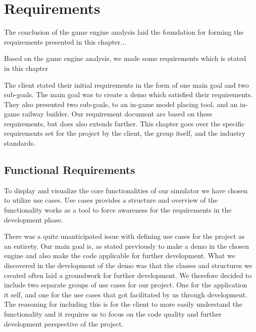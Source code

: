 \chapter{Requirements}

The conclusion of the game engine analysis laid the foundation for forming the requirements presented in this chapter...

Based on the game engine analysis, we made some requirements which is stated in this chapter


The client stated their initial requirements in the form of one main goal and two sub-goals. The main goal was to create a demo which satisfied their requirements. They also presented two sub-goals, to an in-game model placing tool, and an in-game railway builder. Our requirement document are based on these requirements, but does also extends further. This chapter goes over the specific requirements set for the project by the client, the group itself, and the industry standards.


\section{Functional Requirements}

To display and visualize the core functionalities of our simulator we have chosen to utilize use cases. Use cases provides a structure and overview of the functionality works as a tool to force awareness for the requirements in the development phase. 

There was a quite unanticipated issue with defining use cases for the project as an entirety. Our main goal is, as stated previously to make a demo in the chosen engine and also make the code applicable for further development. What we discovered in the development of the demo was that the classes and structures we created often laid a groundwork for further development. We therefore decided to include two separate groups of use cases for our project. One for the application it self, and one for the use cases that got facilitated by us through development. The reasoning for including this is for the client to more easily understand the functionality and it requires us to focus on the code quality and further development perspective of the project.


